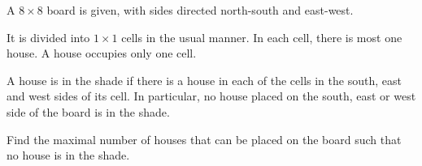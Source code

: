 A $8 \times 8$ board is given, with sides directed north-south and east-west.

It is divided into $1 \times 1$ cells in the usual manner. In each cell, there is most one house. A house occupies only one cell.

A house is  in the shade if there is a house in each of the cells in the south, east and west sides of its cell. In particular, no house placed on the south, east or west side of the board is in the shade.

Find the maximal number of houses that can be placed on the board such that no house is in the shade.